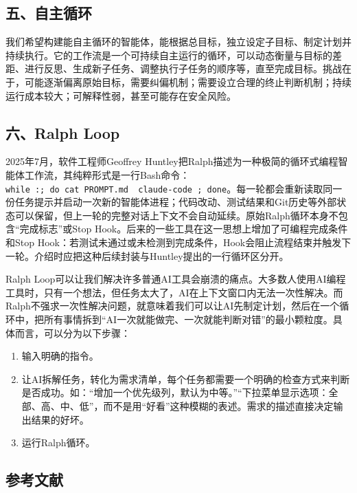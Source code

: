 \hypertarget{ux4e94ux81eaux4e3bux5faaux73af}{%
\subsection{五、自主循环}\label{ux4e94ux81eaux4e3bux5faaux73af}}

我们希望构建能自主循环的智能体，能根据总目标，独立设定子目标、制定计划并持续执行。它的工作流是一个可持续自主运行的循环，可以动态衡量与目标的差距、进行反思、生成新子任务、调整执行子任务的顺序等，直至完成目标。挑战在于，可能逐渐偏离原始目标，需要纠偏机制；需要设立合理的终止判断机制；持续运行成本较大；可解释性弱，甚至可能存在安全风险。

\hypertarget{ux516dralph-loop}{%
\subsection{六、Ralph Loop}\label{ux516dralph-loop}}

2025年7月，软件工程师Geoffrey Huntley把Ralph描述为一种极简的循环式编程智能体工作流，其纯粹形式是一行Bash命令：\texttt{while\ :;\ do\ cat\ PROMPT.md\ \textbar{}\ claude-code\ ;\ done}。每一轮都会重新读取同一份任务提示并启动一次新的智能体进程；代码改动、测试结果和Git历史等外部状态可以保留，但上一轮的完整对话上下文不会自动延续。原始Ralph循环本身不包含``完成标志''或Stop Hook。后来的一些工具在这一思想上增加了可编程完成条件和Stop Hook：若测试未通过或未检测到完成条件，Hook会阻止流程结束并触发下一轮。介绍时应把这种后续封装与Huntley提出的一行循环区分开。

Ralph Loop可以让我们解决许多普通AI工具会崩溃的痛点。大多数人使用AI编程工具时，只有一个想法，但任务太大了，AI在上下文窗口内无法一次性解决。而Ralph不强求一次性解决问题，就意味着我们可以让AI先制定计划，然后在一个循环中，把所有事情拆到``AI一次就能做完、一次就能判断对错''的最小颗粒度。具体而言，可以分为以下步骤：

\begin{enumerate}
\def\labelenumi{\arabic{enumi}.}
\item
  输入明确的指令。
\item
  让AI拆解任务，转化为需求清单，每个任务都需要一个明确的检查方式来判断是否成功。如：``增加一个优先级列，默认为中等。''``下拉菜单显示选项：全部、高、中、低''，而不是用``好看''这种模糊的表述。需求的描述直接决定输出结果的好坏。
\item
  运行Ralph循环。
\end{enumerate}

\FloatBarrier
{}
\hypertarget{ux53c2ux8003ux6587ux732e-114}{%
\subsection{参考文献}\label{ux53c2ux8003ux6587ux732e-114}}

